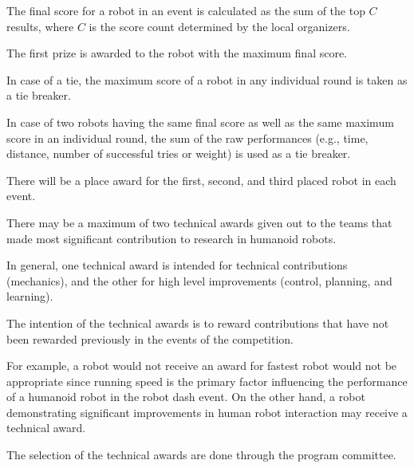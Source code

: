 \documentclass[12pt]{hurocup}
\begin{document}

\begin{lawlist}[ORG]
  
\item The final score for a robot in an event is calculated as the sum of 
 the top $C$ results, where $C$ is the score count determined by the local
 organizers.
  
\item The first prize is awarded to the robot with the maximum final score.
  
\item In case of a tie, the maximum score of a robot in any individual
  round is taken as a tie breaker.
  
\item In case of two robots having the same final score as well as the
 same maximum score in an individual round, the sum of the raw
 performances (e.g., time, distance, number of successful tries or
 weight) is used as a tie breaker.

\item There will be a place award for the first, second, and third
  placed robot in each event.

\end{lawlist}


\begin{lawlist}[ORG]
  
\item There may be a maximum of two technical awards given out to the
  teams that made most significant contribution to research in
  humanoid robots. 
  
\item In general, one technical award is intended for technical
  contributions (mechanics), and the other for high level improvements
  (control, planning, and learning).
  
\item The intention of the technical awards is to reward contributions
  that have not been rewarded previously in the events of the
  competition. 
  
  For example, a robot would not receive an award for fastest robot
  would not be appropriate since running speed is the primary factor
  influencing the performance of a humanoid robot in the robot dash
  event. On the other hand, a robot demonstrating significant
  improvements in human robot interaction may receive a technical
  award.

\item The selection of the technical awards are done through the
  program committee.

\end{lawlist}
\end{document}
